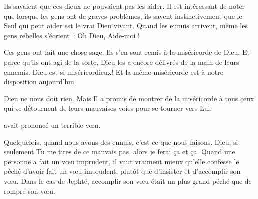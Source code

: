 Ils savaient que ces dieux ne pouvaient pas les aider.
 Il est intéressant de noter que lorsque les gens ont de graves problèmes,
 ils savent instinctivement que le Seul qui peut aider est le vrai Dieu vivant.
 Quand les ennuis arrivent, même les gens rebelles s'écrient~:
 \og Oh Dieu, Aide-moi ! \fg{}


Ces gens ont fait une chose sage. Ils s'en sont remis à la miséricorde de Dieu.
 Et parce qu'ils ont agi de la sorte, Dieu les a encore délivrés
 de la main de leurs ennemis. Dieu est si miséricordieux!
 Et la même miséricorde est à notre disposition aujourd'hui.

Dieu ne nous doit rien. Mais Il a promis de montrer de la miséricorde
 à tous ceux qui se détournent de leurs mauvaises voies
 pour se tourner vers Lui. 

\dvrule






 avait prononcé un terrible vœu.

Quelquefois, quand nous avons des ennuis, c'est ce que nous faisons.
 \og Dieu, si seulement Tu me tires de ce mauvais pas,
 alors je ferai ça et ça. \fg{}
 Quand une personne a fait un vœu imprudent,
 il vaut vraiment mieux qu'elle confesse le péché d'avoir fait un vœu imprudent,
 plutôt que d'insister et d'accomplir son vœu.
 Dans le cas de Jephté, accomplir son vœu était un plus grand péché
 que de rompre son vœu.


